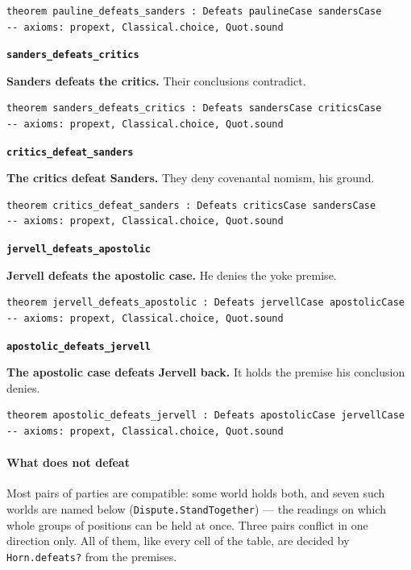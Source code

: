 \documentclass[11pt]{article}
\begin{document}
{\small\begin{verbatim}
theorem pauline_defeats_sanders : Defeats paulineCase sandersCase
-- axioms: propext, Classical.choice, Quot.sound
\end{verbatim}}
\par\medskip\noindent\textbf{\texttt{sanders\_\allowbreak{}defeats\_\allowbreak{}critics}}\par\nobreak\noindent
\textbf{Sanders defeats the critics.} Their conclusions contradict.

{\small\begin{verbatim}
theorem sanders_defeats_critics : Defeats sandersCase criticsCase
-- axioms: propext, Classical.choice, Quot.sound
\end{verbatim}}
\par\medskip\noindent\textbf{\texttt{critics\_\allowbreak{}defeat\_\allowbreak{}sanders}}\par\nobreak\noindent
\textbf{The critics defeat Sanders.} They deny covenantal nomism, his ground.

{\small\begin{verbatim}
theorem critics_defeat_sanders : Defeats criticsCase sandersCase
-- axioms: propext, Classical.choice, Quot.sound
\end{verbatim}}
\par\medskip\noindent\textbf{\texttt{jervell\_\allowbreak{}defeats\_\allowbreak{}apostolic}}\par\nobreak\noindent
\textbf{Jervell defeats the apostolic case.} He denies the yoke premise.

{\small\begin{verbatim}
theorem jervell_defeats_apostolic : Defeats jervellCase apostolicCase
-- axioms: propext, Classical.choice, Quot.sound
\end{verbatim}}
\par\medskip\noindent\textbf{\texttt{apostolic\_\allowbreak{}defeats\_\allowbreak{}jervell}}\par\nobreak\noindent
\textbf{The apostolic case defeats Jervell back.} It holds the premise his conclusion denies.

{\small\begin{verbatim}
theorem apostolic_defeats_jervell : Defeats apostolicCase jervellCase
-- axioms: propext, Classical.choice, Quot.sound
\end{verbatim}}
\paragraph*{What does not defeat}
\leavevmode\par
Most pairs of parties are compatible: some world holds both, and seven such worlds are named below (\texttt{Dispute.Stand\allowbreak{}Together}) — the readings on which whole groups of positions can be held at once. Three pairs conflict in one direction only. All of them, like every cell of the table, are decided by \texttt{Horn.defeats?} from the premises.
\end{document}
